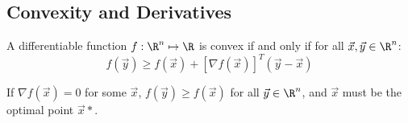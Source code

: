 \documentclass[../Main.tex]{subfiles}
\begin{document}
\subsection{Convexity and Derivatives}
\begin{theorem}
    A differentiable function $f : \R^n \mapsto \R$ is convex if and only if for all $\vec{x}, \vec{y} \in \R^n$:
    \begin{equation}
        f(\vec{y}) \geq f(\vec{x}) + \left[\nabla f(\vec{x})\right]^T(\vec{y} - \vec{x})
        \label{eqnFirstOrderCondition}
    \end{equation}
    \label{thmFirstOrderCondition}
\end{theorem}
\begin{remark}
    If $\nabla f(\vec{x}) = 0$ for some $\vec{x}$, $f(\vec{y}) \geq f(\vec{x})$ for all $\vec{y} \in \R^n$, and $\vec{x}$ must be the optimal point $\vec{x}*$.
\end{remark}
\end{document}

